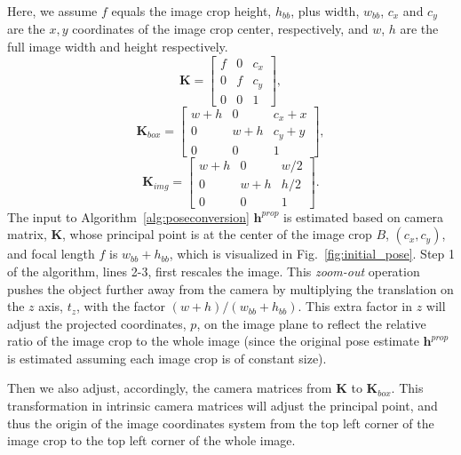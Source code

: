 \documentclass[final]{cvpr}
\begin{document}
Here, we assume $f$ equals the image crop height, $h_{bb}$, plus width, $w_{bb}$, $c_x$ and $c_y$ are the $x,y$ coordinates of the image crop center, respectively, and $w$, $h$ are the full image width and height respectively.
\begin{equation}
    \mathbf{K} = \begin{bmatrix}
    f & 0 & c_x\\
    0 & f & c_y \\
    0 & 0 & 1
    \end{bmatrix},\label{eq:append:intrinsic}
\end{equation}
\begin{equation}
    \mathbf{K}_{box} = \begin{bmatrix}
    w+h & 0 & c_x + x\\
    0 & w+h & c_y + y\\
    0 & 0 & 1
    \end{bmatrix},\label{eq:append:cropproj}
\end{equation}
\begin{equation}
    \mathbf{K}_{img} = \begin{bmatrix}
    w+h & 0 & w/2\\
    0 & w+h & h/2 \\
    0 & 0 & 1
    \end{bmatrix}.\label{eq:append:imgproj}
\end{equation}
The input to Algorithm~\ref{alg:poseconversion} $\mathbf{h}^{prop}$ is estimated based on camera matrix, $\mathbf{K}$, whose principal point is at the center of the image crop $B$, $(c_x, c_y)$, and focal length $f$ is $w_{bb} + h_{bb}$, which is visualized in Fig.~\ref{fig:initial_pose}.
Step 1 of the algorithm, lines 2-3, first rescales the image. This {\em zoom-out} operation pushes the object further away from the camera by multiplying the translation on the $z$ axis, $t_z$, with the factor $(w+h) / (w_{bb} + h_{bb})$. This extra factor in $z$ will adjust the projected coordinates, $p$, on the image plane to reflect the relative ratio of the image crop to the whole image (since the original pose estimate $\mathbf{h}^{prop}$ is estimated assuming each image crop is of constant size).

Then we also adjust, accordingly, the camera matrices from $\mathbf{K}$ to $\mathbf{K}_{box}$. This transformation in intrinsic camera matrices will adjust the principal point, and thus the origin of the image coordinates system from the top left corner of the image crop to the top left corner of the whole image. 
\end{document}
